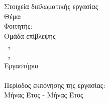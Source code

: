 \pagestyle{empty}
\hspace{10pt}
\begin{center}
\Large{Στοιχεία διπλωματικής εργασίας}\\[1cm]
{\large Θέμα:}
\textbf{\large \doctitle}\\[1cm]
\large {Φοιτητής: \textbf{\nomme}\\[1cm]
\large{Ομάδα επίβλεψης}\\
\textbf{\suptitle \, \supname , \supuni}\\[1cm]
\textbf{\cosuptitle \, \cosupname , \cosupuni} \\[1cm]
Εργαστήρια\\
\lab \\[1cm]
Περίοδος εκπόνησης της εργασίας:\\ Μήνας Έτος - Μήνας Έτος\\[1cm]}
\end{center}

\vspace{5em}

